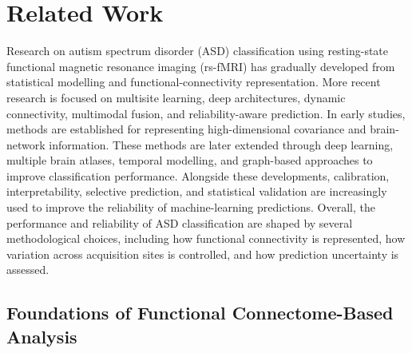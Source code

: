 \section{Related Work}
\label{sec:related}

Research on autism spectrum disorder (ASD) classification using resting-state functional magnetic resonance imaging (rs-fMRI) has gradually developed from statistical modelling and functional-connectivity representation. More recent research is focused on multisite learning, deep architectures, dynamic connectivity, multimodal fusion, and reliability-aware prediction. In early studies, methods are established for representing high-dimensional covariance and brain-network information. These methods are later extended through deep learning, multiple brain atlases, temporal modelling, and graph-based approaches to improve classification performance. Alongside these developments, calibration, interpretability, selective prediction, and statistical validation are increasingly used to improve the reliability of machine-learning predictions. Overall, the performance and reliability of ASD classification are shaped by several methodological choices, including how functional connectivity is represented, how variation across acquisition sites is controlled, and how prediction uncertainty is assessed.

\subsection{Foundations of Functional Connectome-Based Analysis}


